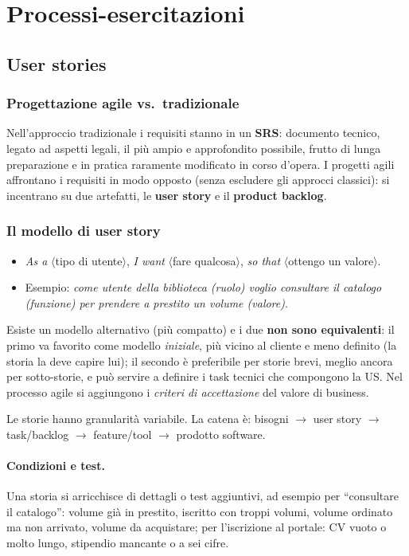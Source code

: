 \documentclass[a4paper,12pt]{article}
\begin{document}
\newpage
\section{Processi-esercitazioni}
\subsection{User stories}

\subsubsection{Progettazione agile vs.\ tradizionale}
Nell'approccio tradizionale i requisiti stanno in un \textbf{SRS}: documento tecnico,
legato ad aspetti legali, il più ampio e approfondito possibile, frutto di lunga
preparazione e in pratica raramente modificato in corso d'opera. I progetti agili
affrontano i requisiti in modo opposto (senza escludere gli approcci classici): si
incentrano su due artefatti, le \textbf{user story} e il \textbf{product backlog}.

\subsubsection{Il modello di user story}
\begin{itemize}
  \item \emph{As a} $\langle$tipo di utente$\rangle$, \emph{I want} $\langle$fare
        qualcosa$\rangle$, \emph{so that} $\langle$ottengo un valore$\rangle$.
  \item Esempio: \emph{come utente della biblioteca (ruolo) voglio consultare il
        catalogo (funzione) per prendere a prestito un volume (valore)}.
\end{itemize}
Esiste un modello alternativo (più compatto) e i due \textbf{non sono equivalenti}: il
primo va favorito come modello \emph{iniziale}, più vicino al cliente e meno definito
(la storia la deve capire lui); il secondo è preferibile per storie brevi, meglio ancora
per sotto-storie, e può servire a definire i task tecnici che compongono la US. Nel
processo agile si aggiungono i \emph{criteri di accettazione} del valore di business.

Le storie hanno granularità variabile. La catena è: bisogni $\to$ user story $\to$
task/backlog $\to$ feature/tool $\to$ prodotto software.

\paragraph{Condizioni e test.} Una storia si arricchisce di dettagli o test aggiuntivi,
ad esempio per ``consultare il catalogo'': volume già in prestito, iscritto con troppi
volumi, volume ordinato ma non arrivato, volume da acquistare; per l'iscrizione al
portale: CV vuoto o molto lungo, stipendio mancante o a sei cifre.
\end{document}
